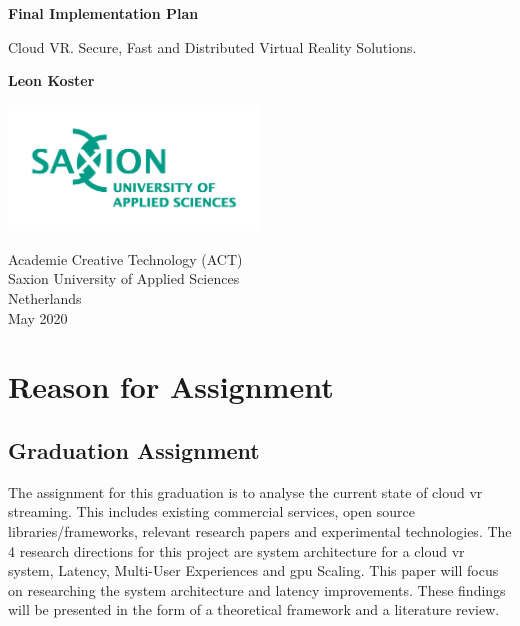\documentclass[]{article}
\begin{document}
\begin{titlepage}
   \begin{center}
       \vspace*{1cm}

       \textbf{Final Implementation Plan}

       \vspace{0.5cm}
       Cloud VR. Secure, Fast and Distributed Virtual Reality Solutions.
       \vspace{1.5cm}

       \textbf{Leon Koster}

       \vfill
            
       \vspace{0.8cm}
     
      \includegraphics[width=0.5\textwidth]{university}
            
       Academie Creative Technology (ACT)\\
       Saxion University of Applied Sciences\\
       Netherlands\\
       May 2020
            
   \end{center}
\end{titlepage}

\tableofcontents
\newpage
\printnoidxglossary[type=\acronymtype]



\newpage
\section{Reason for Assignment}
\subsection{Graduation Assignment}
The assignment for this graduation is to analyse the current state of cloud \acrshort{vr} streaming. This includes existing commercial services, open source libraries/frameworks, relevant research papers and experimental technologies. The 4 research directions for this project are system architecture for a cloud \acrshort{vr} system, Latency, Multi-User Experiences and \acrshort{gpu} Scaling. This paper will focus on researching the system architecture and latency improvements. These findings will be presented in the form of a theoretical framework and a literature review.
\end{document}
